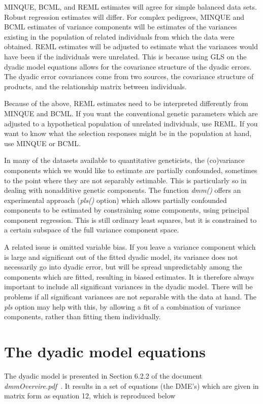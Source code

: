 \documentclass[titlepage]{article}  %
\begin{document}
MINQUE, BCML, and REML estimates will agree for simple balanced data sets. Robust regression estimates will differ. For complex pedigrees, MINQUE and BCML estimates of variance components will be estimates of the variances existing in the population of related individuals from which the data were obtained. REML estimates will be adjusted to estimate what the variances would have been if the individuals were unrelated. This is because using GLS on the dyadic model equations allows for the covariance structure of the dyadic errors. The dyadic error covariances come from two sources, the covariance structure of products, and the relationship matrix between individuals. 

Because of the above, REML estimates need to be interpreted differently from MINQUE and BCML. If you want the conventional genetic parameters which are adjusted to a hypothetical population of unrelated individuals, use REML. If you want to know what the selection responses might be in the population at hand, use MINQUE or BCML. 

  In many of the datasets available to quantitative geneticists, the (co)variance components which we would like to estimate are partially confounded, sometimes to the point where they  are not separably estimable. This is particularly so in dealing with nonadditive genetic components. The function {\em dmm()} offers an experimental approach ({\em pls()} option) which allows partially confounded components to be estimated by constraining some components, using principal component regression. This is still ordinary least squares, but it is constrained to a certain subspace of the full variance component space.

  A related issue is omitted variable bias. If you leave a variance component which is large and significant out of the fitted dyadic model, its variance does not necessarily go into dyadic error, but will be spread unpredictably among the components which are fitted, resulting in biased estimates. It is therefore always important to include all significant variances in the dyadic model. There will be problems if all significant variances are not separable with the data at hand. The {\em pls} option may help with this, by allowing a fit of a combination of variance components, rather than fitting them individually.
 
\section{The dyadic model equations}
The dyadic model is presented in Section 6.2.2  of the document {\em dmmOvervire.pdf}~\cite{jack:15}. It results in a set of equations (the DME's) which are given in matrix form as equation 12, which is reproduced below
\end{document}
